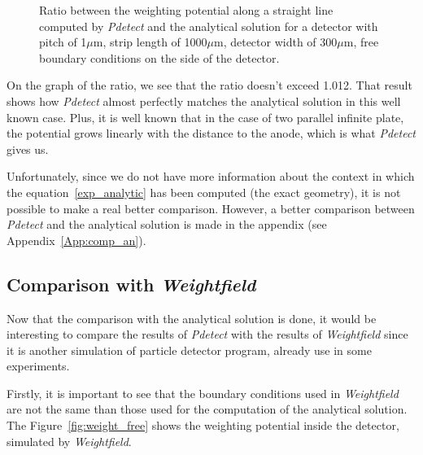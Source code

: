 \documentclass[11pt]{article}
\begin{document}
\begin{figure}[H]
\begin{minipage}[b]{.46\linewidth}
				\caption{Ratio between the weighting potential along a straight line
						computed by \textit{Pdetect} and the analytical solution for a detector with pitch
						of 1$\mu$m, strip length of 1000$\mu$m, detector width of 300$\mu$m, free boundary conditions
						on the side of the detector.}
				\label{fig:parallel_ratio}
			\end{minipage}
		\end{figure}

		On the graph of the ratio, we see that the ratio doesn't exceed 1.012. That result shows how \textit{Pdetect}
		almost perfectly matches the analytical solution in this well known case. Plus, it is well known that in the case
		of two parallel infinite plate, the potential grows linearly with the distance to the anode, which is what 
		\textit{Pdetect} gives us.

		Unfortunately, since we do not have more information about the context in which the equation~\ref{exp_analytic}
		has been computed (the exact geometry), it is not possible to make a real better comparison. However,
		a better comparison between \textit{Pdetect} and the analytical solution is made in the appendix (see
		Appendix~\ref{App:comp_an}).

	\subsection{Comparison with \textit{Weightfield}}

		Now that the comparison with the analytical solution is done, it would be interesting to compare the results
		of \textit{Pdetect} with the results of \textit{Weightfield} since it is another simulation of particle detector
		program, already use in some experiments.

		Firstly, it is important to see that the boundary conditions used in \textit{Weightfield} are not the same
		than those used for the computation of the analytical solution. The Figure~\ref{fig:weight_free} shows
		the weighting potential inside the detector, simulated by \textit{Weightfield}.
\end{document}
